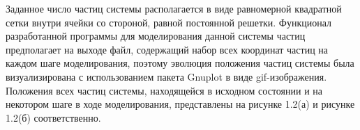 \documentclass[14pt,a4paper,report]{ncc}
\begin{document}
Заданное число частиц системы располагается в виде равномерной квадратной сетки внутри ячейки со стороной, равной постоянной решетки. Функционал разработанной программы для моделирования данной системы частиц предполагает на выходе файл, содержащий набор всех координат частиц на каждом шаге моделирования, поэтому эволюция положения частиц системы была визуализирована с использованием пакета Gnuplot в виде gif-изображения. Положения всех частиц системы, находящейся в исходном состоянии и на некотором шаге в ходе моделирования, представлены на рисунке 1.2(а) и рисунке 1.2(б) соответственно.


\begin{figure}[!h]
\begin{minipage}[!h]{0.5\linewidth}
\end{minipage}
\hfill
\begin{minipage}[!h]{0.5\linewidth}

\end{minipage}
\end{figure}
\end{document}
